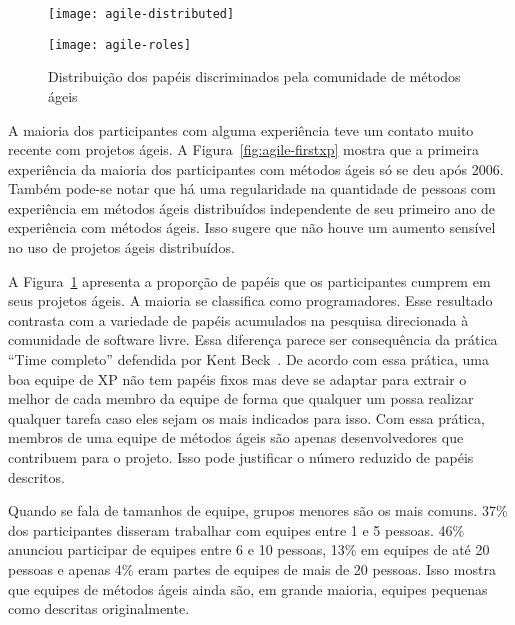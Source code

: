 \begin{figure}[thb]
  \begin{minipage}[t]{0.6\linewidth}
    \centering
    \texttt{[image: agile-distributed]}
    \caption{Ano da 1$^{\textrm{a}}$ experiência com métodos ágeis com
      experiência distribuída ou não}
    \label{fig:agile-firstxp}
  \end{minipage}
  \begin{minipage}[t]{0.4\linewidth}
    \centering
    \texttt{[image: agile-roles]}
    \caption{Distribuição dos papéis discriminados pela comunidade de
      métodos ágeis}
    \label{fig:agile-roles}
  \end{minipage}
\end{figure}

A maioria dos participantes com alguma experiência teve um contato
muito recente com projetos ágeis. A Figura~\ref{fig:agile-firstxp}
mostra que a primeira experiência da maioria dos participantes com
métodos ágeis só se deu após 2006. Também pode-se notar que há uma
regularidade na quantidade de pessoas com experiência em métodos ágeis
distribuídos independente de seu primeiro ano de experiência com
métodos ágeis. Isso sugere que não houve um aumento sensível no uso de
projetos ágeis distribuídos.


A Figura~\ref{fig:agile-roles} apresenta a proporção de papéis que os
participantes cumprem em seus projetos ágeis. A maioria se classifica
como programadores. Esse resultado contrasta com a variedade de papéis
acumulados na pesquisa direcionada à comunidade de software
livre. Essa diferença parece ser consequência da prática ``Time
completo'' defendida por Kent Beck~\cite{XP01}. De acordo com essa
prática, uma boa equipe de XP não tem papéis fixos mas deve se adaptar
para extrair o melhor de cada membro da equipe de forma que qualquer
um possa realizar qualquer tarefa caso eles sejam os mais indicados
para isso. Com essa prática, membros de uma equipe de métodos ágeis
são apenas desenvolvedores que contribuem para o projeto. Isso pode
justificar o número reduzido de papéis descritos.


Quando se fala de tamanhos de equipe, grupos menores são os mais
comuns. 37\% dos participantes disseram trabalhar com equipes entre 1
e 5 pessoas. 46\% anunciou participar de equipes entre 6 e 10 pessoas,
13\% em equipes de até 20 pessoas e apenas 4\% eram partes de equipes
de mais de 20 pessoas. Isso mostra que equipes de métodos ágeis ainda
são, em grande maioria, equipes pequenas como descritas originalmente.


